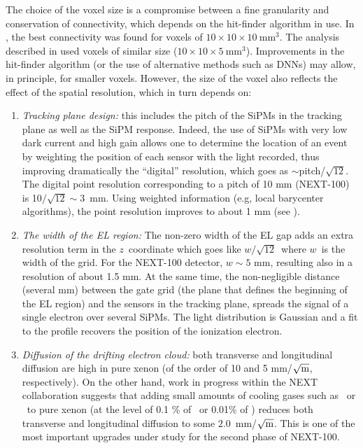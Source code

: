 \documentclass[a4paper,11pt]{article}
\begin{document}
The choice of the voxel size is a compromise between a fine granularity and conservation of connectivity, which depends on the hit-finder algorithm in use. In \cite{NEXT_topology},  the best connectivity  was  found for voxels of 
$10 \times 10 \times 10 \mathrm{~mm^3}$. The analysis described in \cite{Martin-Albo:2015rhw} used voxels
of similar size ($10 \times 10 \times 5 \mathrm{~mm^3}$).  Improvements in the hit-finder algorithm (or the use of alternative methods such as DNNs) may allow, in principle, for smaller voxels. However, the size of the voxel also reflects the effect of the spatial resolution, which in turn depends on: 

\begin{enumerate}
\item {\em Tracking plane design:} this includes the pitch of the SiPMs in the tracking plane as well as the SiPM response. Indeed, the use of SiPMs with very low dark current and high gain allows one to determine the location of an event by weighting the position of each sensor with the light recorded, thus improving dramatically the ``digital'' resolution, which goes as $\sim$pitch/$\sqrt{12}$. The digital point resolution corresponding to a pitch of 10 mm (NEXT-100) is 10$/\sqrt{12} \sim 3$~mm. Using weighted information (e.g, local barycenter algorithms), the point resolution improves to about 1 mm (see \cite{Lorca:2014sra}). 
\item {\em The width of the EL region:}
The non-zero width of the EL gap adds an extra resolution term in the $z$~coordinate which goes like $w/\sqrt{12}$~where $w$~is the width of the grid. For the NEXT-100 detector, $w\sim 5$ mm, resulting also in a resolution of about 1.5 mm. At the same time, the non-negligible distance (several mm) between the gate grid (the plane that defines the beginning of the EL region) and the sensors in the tracking plane, spreads the signal of a single electron over several SiPMs. The light distribution is Gaussian and a fit to the profile recovers the position of the ionization electron.
\item {\em Diffusion of the drifting electron cloud:} both transverse and longitudinal diffusion are high in pure xenon (of the order of 10 and 5 mm/$\sqrt{\rm{m}}$, respectively). On the other hand, work in progress within the NEXT collaboration \cite{Azevedo:2015eok} suggests that adding small amounts of cooling gases such as \CHF\ or \CFF\ to pure xenon (at the level of 0.1 \% of \CHF\ or 0.01\% of \CFF) reduces both transverse and longitudinal diffusion to some $2.0$~mm/$\sqrt{\rm{m}}$. This is one of the most important upgrades under study for the second phase of NEXT-100. 
\end{enumerate}
\end{document}
